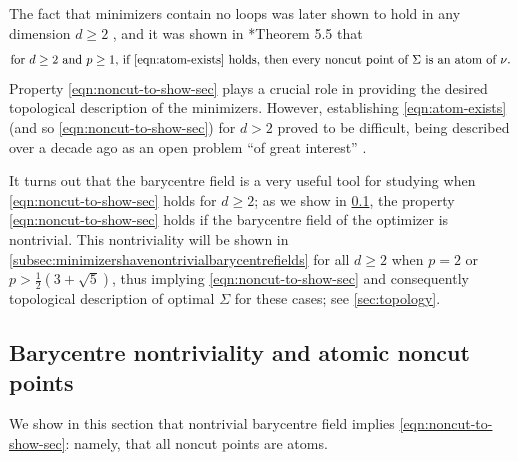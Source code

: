 \documentclass[preprint, reqno]{amsart}
\theoremstyle{definition}
\numberwithin{equation}{section}
\begin{document}
The fact that minimizers contain no loops was later shown to hold in
any dimension $d \geq 2$ \cite[Theorem 5.6]{Stepanov04}, and it was
shown in \cite{Stepanov06}*{Theorem 5.5} that
\begin{equation}\label{eqn:noncut-to-show-sec}
  \hbox{\small for $d\geq 2$ and $p \geq 1$, if
    \eqref{eqn:atom-exists} holds, then every noncut point of $\Sigma$
    is an atom of $\nu$}.
\end{equation}
Property \eqref{eqn:noncut-to-show-sec} plays a crucial role in
providing the desired topological description of the minimizers.
However, establishing \eqref{eqn:atom-exists} (and so
\eqref{eqn:noncut-to-show-sec}) for $d > 2$ proved to be difficult,
being described over a decade ago as an open problem ``of great
interest'' \cite{Lemenant12}.

It turns out that the barycentre field is a very useful tool for
studying when \eqref{eqn:noncut-to-show-sec} holds for $d \geq 2$; as
we show in \cref{subsec:barycentrenontrivialityandthekeylemma}, the
property \eqref{eqn:noncut-to-show-sec} holds if the barycentre field
of the optimizer is nontrivial. This nontriviality will be shown in
\cref{subsec:minimizershavenontrivialbarycentrefields} for all $d \geq
2$ when $p = 2$ or $p > \frac{1}{2}(3 + \sqrt{5})$, thus implying
\eqref{eqn:noncut-to-show-sec} and consequently topological
description of optimal $\Sigma$ for these cases; see
\cref{sec:topology}.

\subsection{Barycentre nontriviality and atomic noncut
  points}\label{subsec:barycentrenontrivialityandthekeylemma}

We show in this section that nontrivial barycentre field implies
\eqref{eqn:noncut-to-show-sec}: namely, that all noncut points are
atoms.
\end{document}
